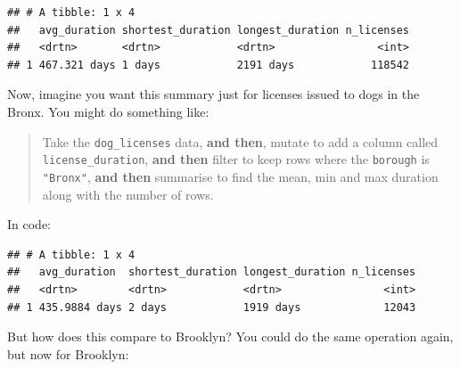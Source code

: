 \documentclass[]{Nemilov}
\newenvironment{Shaded}{\begin{snugshade}}{\end{snugshade}}
\newcommand{\DataTypeTok}[1]{\textcolor[rgb]{0.13,0.29,0.53}{#1}}
\newcommand{\KeywordTok}[1]{\textcolor[rgb]{0.13,0.29,0.53}{\textbf{#1}}}
\newcommand{\NormalTok}[1]{#1}
\newcommand{\OperatorTok}[1]{\textcolor[rgb]{0.81,0.36,0.00}{\textbf{#1}}}
\newcommand{\StringTok}[1]{\textcolor[rgb]{0.31,0.60,0.02}{#1}}
\begin{document}
\begin{verbatim}
## # A tibble: 1 x 4
##   avg_duration shortest_duration longest_duration n_licenses
##   <drtn>       <drtn>            <drtn>                <int>
## 1 467.321 days 1 days            2191 days            118542
\end{verbatim}

Now, imagine you want this summary just for licenses issued to dogs in the Bronx. You might do something like:

\begin{quote}
Take the \texttt{dog\_licenses} data, \textbf{and then},
mutate to add a column called \texttt{license\_duration}, \textbf{and then}
filter to keep rows where the \texttt{borough} is \texttt{"Bronx"}, \textbf{and then}
summarise to find the mean, min and max duration along with the number of rows.
\end{quote}

In code:

\begin{Shaded}
\end{Shaded}

\begin{verbatim}
## # A tibble: 1 x 4
##   avg_duration  shortest_duration longest_duration n_licenses
##   <drtn>        <drtn>            <drtn>                <int>
## 1 435.9884 days 2 days            1919 days             12043
\end{verbatim}

But how does this compare to Brooklyn? You could do the same operation again, but now for Brooklyn:
\end{document}
